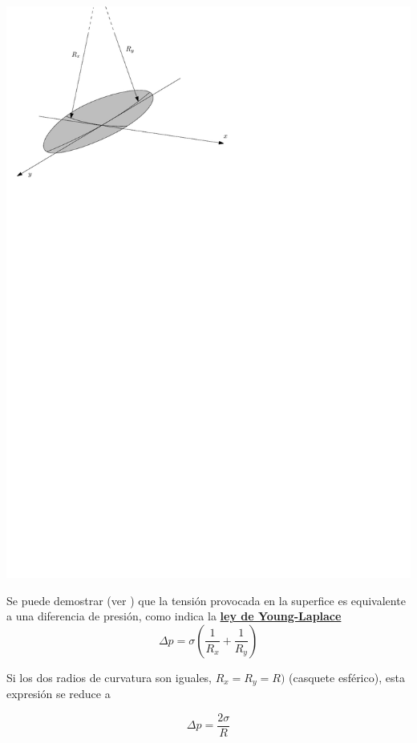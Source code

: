 \begin{center}
\includegraphics{TeX_files/chapter01-Introduccion/YoungLaplace}
\end{center}
Se puede demostrar (ver \cite{Bat}) que la tensi\'on provocada en la superfice es equivalente a una diferencia
de presi\'on, como indica la \href{https://es.wikipedia.org/wiki/Ley_de_Laplace}{\textbf{ley de Young-Laplace}}
$$\Delta p = \sigma\left(\frac{1}{R_x}+\frac{1}{R_y}\right)$$


Si los dos radios de curvatura son iguales, $R_x=R_y=R)$ (casquete esférico), esta expresión se reduce a 
 
\begin{equation}
	\Delta p = \frac{2\sigma}{R}
\end{equation}

